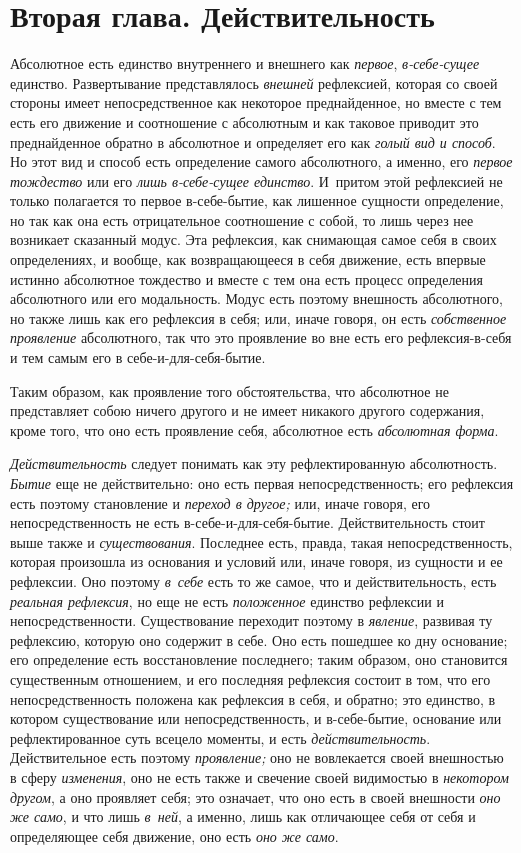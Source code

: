 \chapter[{\em Вторая глава} Действительность]{Вторая глава. Действительность}

Абсолютное есть единство внутреннего и внешнего как {\em первое},
{\em в-себе-сущее} единство. Развертывание
представлялось {\em внешней} рефлексией, которая со
своей стороны имеет непосредственное как некоторое преднайденное, но вместе
с тем есть его движение и соотношение с абсолютным и как таковое приводит
это преднайденное обратно в абсолютное и определяет его как
{\em голый вид и способ}. Но этот вид и способ есть
определение самого абсолютного, а именно, его
{\em первое тождество} или его
{\em лишь в-себе-сущее единство}. И~притом этой
рефлексией не только полагается то первое в-себе-бытие, как лишенное
сущности определение, но так как она есть отрицательное соотношение с
собой, то лишь через нее возникает сказанный модус. Эта рефлексия, как
снимающая самое себя в своих определениях, и вообще, как возвращающееся в
себя движение, есть впервые истинно абсолютное тождество и вместе с тем она
есть процесс определения абсолютного или его модальность. Модус есть
поэтому внешность абсолютного, но также лишь как его рефлексия в себя; или,
иначе говоря, он есть {\em собственное проявление}
абсолютного, так что это проявление во вне есть его рефлексия-в-себя и тем
самым его в себе-и-для-себя-бытие.

Таким образом, как проявление того обстоятельства, что абсолютное не
представляет собою ничего другого и не имеет никакого другого содержания, кроме
того, что оно есть проявление себя, абсолютное есть {\em абсолютная форма}.

{\em Действительность} следует понимать как эту
рефлектированную абсолютность. {\em Бытие} еще не
действительно: оно есть первая непосредственность; его рефлексия есть
поэтому становление и {\em переход в другое;} или,
иначе говоря, его непосредственность не есть в-себе-и-для-себя-бытие.
Действительность стоит выше также и
{\em существования}. Последнее есть, правда, такая
непосредственность, которая произошла из основания и условий или, иначе
говоря, из сущности и ее рефлексии. Оно поэтому
{\em в~себе} есть то же самое, что и действительность,
есть {\em реальная рефлексия}, но еще не есть
{\em положенное} единство рефлексии и
непосредственности. Существование переходит поэтому в
{\em явление}, развивая ту рефлексию, которую оно
содержит в себе. Оно есть пошедшее ко дну основание; его определение есть
восстановление последнего; таким образом, оно становится существенным
отношением, и его последняя рефлексия состоит в том, что его
непосредственность положена как рефлексия в себя, и обратно; это единство,
в котором существование или непосредственность, и в-себе-бытие, основание
или рефлектированное суть всецело моменты, и есть
{\em действительность}. Действительное есть поэтому
{\em проявление;} оно не вовлекается своей внешностью в
сферу {\em изменения}, оно не есть также и свечение
своей видимостью в {\em некотором другом}, а оно
проявляет себя; это означает, что оно есть в своей внешности
{\em оно же само}, и что лишь
{\em в~ней}, а именно, лишь как отличающее себя от себя
и определяющее себя движение, оно есть {\em оно же
само}.

